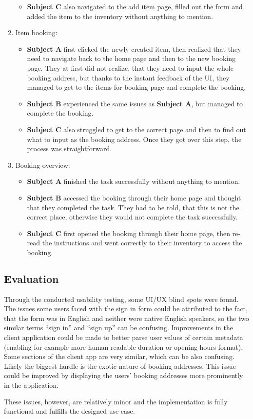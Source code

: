 \begin{enumerate}
\begin{itemize}
        \item \textbf{Subject C} also navigated to the add item page, filled out the form and added the item to the inventory without anything to mention.
    \end{itemize}
    \item Item booking:
    \begin{itemize}
        \item \textbf{Subject A} first clicked the newly created item, then realized that they need to navigate back to the home page and then to the new booking page. They at first did not realize, that they need to input the whole booking address, but thanks to the instant feedback of the UI, they managed to get to the items for booking page and complete the booking.
        \item \textbf{Subject B} experienced the same issues as \textbf{Subject A}, but managed to complete the booking.
        \item \textbf{Subject C} also struggled to get to the correct page and then to find out what to input as the booking address. Once they got over this step, the process was straightforward.
    \end{itemize}
    \item Booking overview:
    \begin{itemize}
        \item \textbf{Subject A} finished the task successfully without anything to mention.
        \item \textbf{Subject B} accessed the booking through their home page and thought that they completed the task. They had to be told, that this is not the correct place, otherwise they would not complete the task successfully.
        \item \textbf{Subject C} first opened the booking through their home page, then re-read the instructions and went correctly to their inventory to access the booking.
    \end{itemize}
\end{enumerate}

\subsection{Evaluation}

Through the conducted usability testing, some UI/UX blind spots were found. The issues some users faced with the sign in form could be attributed to the fact, that the form was in English and neither were native English speakers, so the two similar terms \enquote{sign in} and \enquote{sign up} can be confusing. Improvements in the client application could be made to better parse user values of certain metadata (enabling for example more human readable duration or opening hours format). Some sections of the client app are very similar, which can be also confusing. Likely the biggest hurdle is the exotic nature of booking addresses. This issue could be improved by displaying the users' booking addresses more prominently in the application.

These issues, however, are relatively minor and the implementation is fully functional and fulfills the designed use case.
